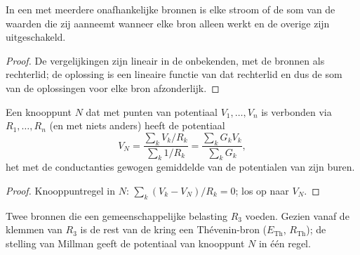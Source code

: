 \begin{theorem}[Superpositie]\label{thm:b1:dc-circuits:superposition}
In een  met meerdere onafhankelijke bronnen is elke stroom of
 de som van de waarden die zij aanneemt wanneer elke bron alleen werkt
en de overige zijn uitgeschakeld.
\end{theorem}

\begin{proof}
De vergelijkingen zijn lineair in de onbekenden, met de bronnen als
rechterlid; de oplossing is een lineaire functie van dat rechterlid en
dus de som van de oplossingen voor elke bron afzonderlijk.
\end{proof}

\begin{proposition}\label{prop:b1:dc-circuits:millman}
Een knooppunt $N$ dat met punten van potentiaal $V_1, \dots, V_n$ is
verbonden via  $R_1, \dots, R_n$ (en met niets anders) heeft de potentiaal
\[
V_N = \frac{\sum_k V_k/R_k}{\sum_k 1/R_k} = \frac{\sum_k G_k V_k}{\sum_k G_k},
\]
het met de conductanties gewogen gemiddelde van de potentialen van zijn buren.
\end{proposition}

\begin{proof}
Knooppuntregel in $N$: $\sum_k (V_k - V_N)/R_k = 0$; los op naar $V_N$.
\end{proof}

\begin{omfigure}

{\small Twee bronnen die een gemeenschappelijke belasting $R_3$ voeden. Gezien
vanaf de klemmen van $R_3$ is de rest van de kring een Thévenin-bron
($E_{\mathrm{Th}}$, $R_{\mathrm{Th}}$); de stelling van Millman geeft de
potentiaal van knooppunt $N$ in één regel.}
\end{omfigure}

